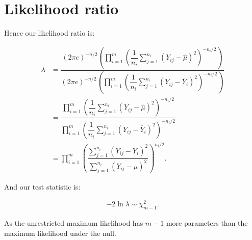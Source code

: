 \documentclass[12pt,a4paper,openright]{article}
\newcommand{\ovY}{\overline{Y}}
\newcommand{\wmu}{\widehat{\mu}}
\begin{document}
	\section{Likelihood ratio}
	Hence our likelihood ratio is:
	
	\begin{align*}
		\lambda &= \dfrac{(2\pi e)^{-n/2}\left(\prod_{i=1}^m \left(\dfrac{1}{n_i} \sum_{j=1}^{n_i} (Y_{ij}-\wmu)^2\right)^{-n_i/2}\right)}{(2\pi e)^{-n/2}\left(\prod_{i=1}^m \left(\dfrac{1}{n_i} \sum_{j=1}^{n_i} (Y_{ij}-\ovY_i)^2\right)^{-n_i/2}\right)} \\
		&= \dfrac{\prod_{i=1}^m \left(\dfrac{1}{n_i} \sum_{j=1}^{n_i} (Y_{ij}-\wmu)^2\right)^{-n_i/2}}{\prod_{i=1}^m \left(\dfrac{1}{n_i} \sum_{j=1}^{n_i} (Y_{ij}-\ovY_i)^2\right)^{-n_i/2}} \\
		&= \prod_{i=1}^m \left(\dfrac{\sum_{j=1}^{n_i} (Y_{ij}-\ovY_i)^2}{\sum_{j=1}^{n_i} (Y_{ij}-\wmu)^2}\right)^{n_i/2}.
	\end{align*}

	And our test statistic is:
	
	\begin{align*}
		-2\ln{\lambda} \sim \chi^2_{m-1}.
	\end{align*}

	As the unrestricted maximum likelihood has $m-1$ more parameters than the maximum likelihood under the null.
\end{document}

